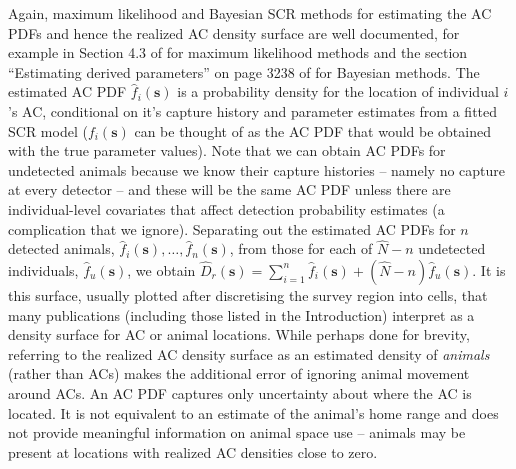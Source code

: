 \documentclass[useAMS,usenatbib,referee]{biom}
\begin{document}
Again, maximum likelihood and Bayesian SCR methods for estimating the AC PDFs and hence the realized AC density surface are well documented, for example in Section 4.3 of \cite{Borchers+Efford:08} for maximum likelihood methods and the section ``Estimating derived parameters'' on page 3238 of \cite{Royle+al:09b} for Bayesian methods. The estimated AC PDF $\widehat{f}_i(\bm{s})$ is a probability density for the location of individual $i$'s AC, conditional on it's capture history and parameter estimates from a fitted SCR model ($f_i(\bm{s})$ can be thought of as the AC PDF that would be obtained with the true parameter values). Note that we can obtain AC PDFs for undetected animals because we know their capture histories -- namely no capture at every detector -- and these will be the same AC PDF unless there are individual-level covariates that affect detection probability estimates (a complication that we ignore). Separating out the estimated AC PDFs for $n$ detected animals, $\widehat{f}_i(\bm{s}),\ldots,\widehat{f}_n(\bm{s})$, from those for each of $\widehat{N}-n$ undetected individuals, $\widehat{f}_u(\bm{s})$, we obtain $\widehat{D}_r(\bm{s}) = \sum_{i = 1}^n \widehat{f}_i(\bm{s}) + (\widehat{N} - n)\widehat{f}_u(\bm{s})$. It is this surface, usually plotted after discretising the survey region into cells, that many publications (including those listed in the Introduction) interpret as a density surface for AC or animal locations. While perhaps done for brevity, referring to the realized AC density surface as an estimated density of {\it animals} (rather than ACs) makes the additional error of ignoring animal movement around ACs. An AC PDF captures only uncertainty about where the AC is located. It is not equivalent to an estimate of the animal's home range and does not provide meaningful information on animal space use --  animals may be present at locations with realized AC densities close to zero.
\end{document}
